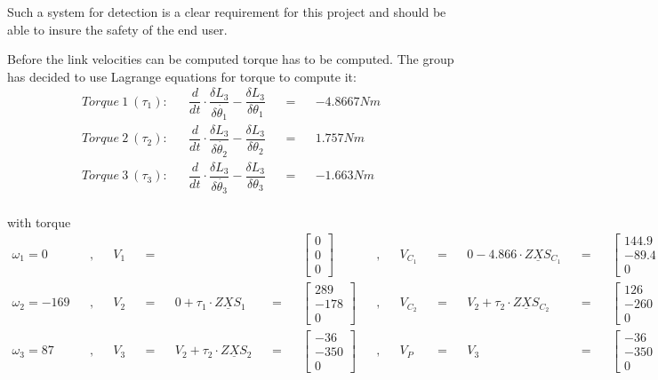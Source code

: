 Such a system for detection is a clear requirement for this project and should be able to insure the safety of the end user.


Before the link velocities can be computed torque has to be computed. The group has decided to use Lagrange equations for torque to compute it:\\

\begin{align*}
    Torque\ 1\ (\tau_1):&& \dfrac{d}{dt}\cdot\dfrac{\delta L_3}{\delta\dot{\theta_1}}-\dfrac{\delta L_3}{\delta\theta_1}&&=&&-4.8667Nm\\
    Torque\ 2\ (\tau_2):&& \dfrac{d}{dt}\cdot\dfrac{\delta L_3}{\delta \dot{\theta_2}}-\dfrac{\delta L_3}{\delta\theta_2}&&=&& 1.757Nm\\
    Torque\ 3\ (\tau_3):&&\dfrac{d}{dt}\cdot\dfrac{\delta L_3}{\delta \dot{\theta_3}}-\dfrac{\delta L_3}{\delta\theta_3}&&=&&-1.663Nm
\end{align*}\\


with torque
\begin{align*}
\omega_1=0&&,&&
    V_1&&=&& &&&&
\left[\begin{matrix}
    0\\
    0\\
    0
\end{matrix}\right]&&,&&V_C_1&&=&&0-4.866\cdot Z\underline{X}S_C_1&&=&&\left[\begin{matrix}
    144.9\\
    -89.4\\
    0
\end{matrix}\right]\\
\omega_2=-169&&,&&
V_2&&=&&0+\tau_1\cdot Z\underline{X}S_1&&=&&
\left[\begin{matrix}
    289\\
    -178\\
    0
\end{matrix}\right]&&,&& V_C_2&&=&&V_2+\tau_2\cdot Z\underline{X}S_C_2&&=&&
\left[\begin{matrix}
    126\\
    -260\\
    0
\end{matrix}\right]\\
\omega_3=87&&,&&
V_3&&=&&V_2+\tau_2\cdot Z\underline{X}S_2&&=&&
\left[\begin{matrix}
    -36\\
    -350\\
    0
\end{matrix}\right]&&,&& V_P&&=&&V_3&&=&&\left[\begin{matrix}
    -36\\
    -350\\
    0
\end{matrix}\right]
\end{align*}